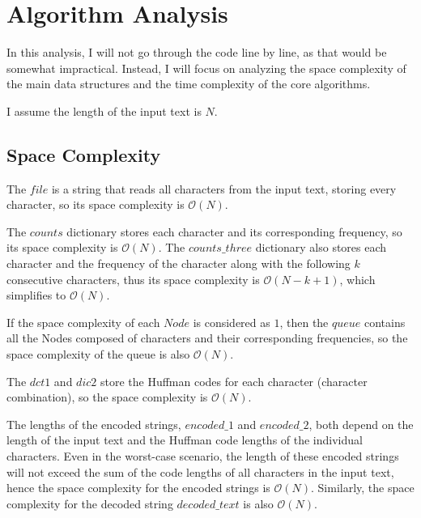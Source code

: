 \documentclass[12pt]{article}
\begin{document}
\section{Algorithm Analysis} 
In this analysis, I will not go through the code line by line, as that would be somewhat impractical. Instead, I will focus on analyzing the space complexity of the main data structures and the time complexity of the core algorithms.
\par I assume the length of the input text is $N$.
\subsection{Space Complexity}
The $file$ is a string that reads all characters from the input text, storing every character, so its space complexity is $\mathcal{O}(N)$.
\par The $counts$ dictionary stores each character and its corresponding frequency, so its space complexity is $\mathcal{O}(N)$. The $counts\_three$ dictionary also stores each character and the frequency of the character along with the following $k$ consecutive characters, thus its space complexity is $\mathcal{O}(N - k + 1)$, which simplifies to $\mathcal{O}(N)$.
\par If the space complexity of each $Node$ is considered as $1$, then the $queue$ contains all the Nodes composed of characters and their corresponding frequencies, so the space complexity of the queue is also $\mathcal{O}(N)$.
\par The $dct1$ and $dic2$ store the Huffman codes for each character (character combination), so the space complexity is $\mathcal{O}(N)$.
\par The lengths of the encoded strings, $encoded\_1$ and $encoded\_2$, both depend on the length of the input text and the Huffman code lengths of the individual characters. Even in the worst-case scenario, the length of these encoded strings will not exceed the sum of the code lengths of all characters in the input text, hence the space complexity for the encoded strings is \(\mathcal{O}(N)\). Similarly, the space complexity for the decoded string $decoded\_text$ is also \(\mathcal{O}(N)\).
\end{document}
